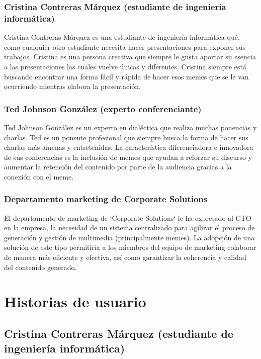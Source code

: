     \subsubsection{Cristina Contreras Márquez (estudiante de ingeniería informática)}

    Cristina Contreras Márquez es una estudiante de ingeniería informática qué, como cualquier otro estudiante necesita hacer presentaciones para exponer sus trabajos. Cristina es una persona creativa que siempre le gusta aportar su esencia a las presentaciones las cuales vuelve únicas y diferentes. Cristina siempre está buscando encontrar una forma fácil y rápida de hacer esos memes que se le van ocurriendo mientras elabora la presentación.

    \subsubsection{Ted Johnson González (experto conferenciante)}

    Ted Johnson González es un experto en dialéctica que realiza muchas ponencias y charlas. Ted es un ponente profesional que siempre busca la forma de hacer sus charlas más amenas y entretenidas. La característica diferenciadora e innovadora de sus conferencias es la inclusión de memes que ayudan a reforzar su discurso y aumentar la retención del contenido por parte de la audiencia gracias a la conexión con el meme.

    \subsubsection{Departamento marketing de Corporate Solutions}

    El departamento de marketing de `Corporate Solutions` le ha expresado al CTO en la empresa, la necesidad de un sistema centralizado para agilizar el proceso de generación y gestión de multimedia (principalmente memes). La adopción de una solución de este tipo permitiría a los miembros del equipo de marketing colaborar de manera más eficiente y efectiva, así como garantizar la coherencia y calidad del contenido generado.

\section{Historias de usuario}

    \subsection{Cristina Contreras Márquez (estudiante de ingeniería informática)}

